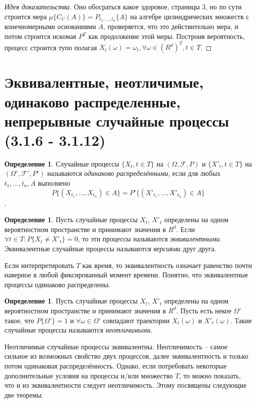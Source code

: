 \documentclass[16pt]{article}
\theoremstyle{definition}
\newtheorem{definition}[theorem]{Определение}
\begin{document}
\begin{proof}[Идея доказательства]
Оно обосраться какое здоровое, страницы 3, но по сути строится мера $\mu\{C_U(A)\} = P_{t_1, \ldots, t_n}\{A\}$ на алгебре цилиндрических множеств с конечномерными основаниями $A$, проверяется, что это действительно мера, и потом строится искомая $P^T$ как продолжение этой меры. Построив вероятность, процесс строится тупо полагая $X_t(\omega) = \omega_t, \forall \omega \in (R^d)^T, t \in T$.
\end{proof}

\section{Эквивалентные, неотличимые, одинаково распределенные, непрерывные случайные процессы (3.1.6 - 3.1.12)}
\begin{definition}
Случайные процессы $\{X_t, t \in T\}$ на $(\Omega, \mathcal{F}, P)$ и $\{X'_t, t \in T\}$ на $(\Omega', \mathcal{F}', P')$ называются \textit{одинаково распределёнными}, если для любых $t_1, \ldots, t_n, A$ выполнено $$P\{(X_{t_1}, \ldots, X_{t_n}) \in A\} = P'\{(X'_{t_1}, \ldots, X'_{t_n}) \in A\}$$.
\end{definition}
\begin{definition}
Пусть случайные процессы $X_t$, $X'_t$ определены на одном вероятностном пространстве и принимают значения в $R^d$. Если $\forall t \in T : P\{X_t \neq X'_t\} = 0$, то эти процессы называются \textit{эквивалентными}. Эквивалентные случайные процессы называются \textit{версиями} друг друга. 
\end{definition}
Если интерпретировать $T$ как время, то эквивалентность означает равенство почти наверное в любой фиксированный момент времени. Понятно, что эквивалентные процессы одинаково распределены.
\begin{definition}
Пусть случайные процессы $X_t$, $X'_t$ определены на одном вероятностном пространстве и принимают значения в $R^d$. Пусть есть некое $\Omega'$ такое, что $P\{\Omega'\} = 1$ и $\forall \omega \in \Omega'$ совпадают траектории $X_t(\omega)$ и $X'_t(\omega)$. Такие случайные процессы называются \textit{неотличимыми}.
\end{definition}
Неотличимые случайные процессы эквивалентны. Неотличимость -- самое сильное из возможных свойство двух процессов, далее эквивалентность и только потом одинаковая распределённость. Однако, если потребовать некоторые дополнительные условия на процессы и/или множество $T$, то можно показать, что и из эквивалентности следует неотличимость. Этому посвящены следующие две теоремы.
\end{document}
